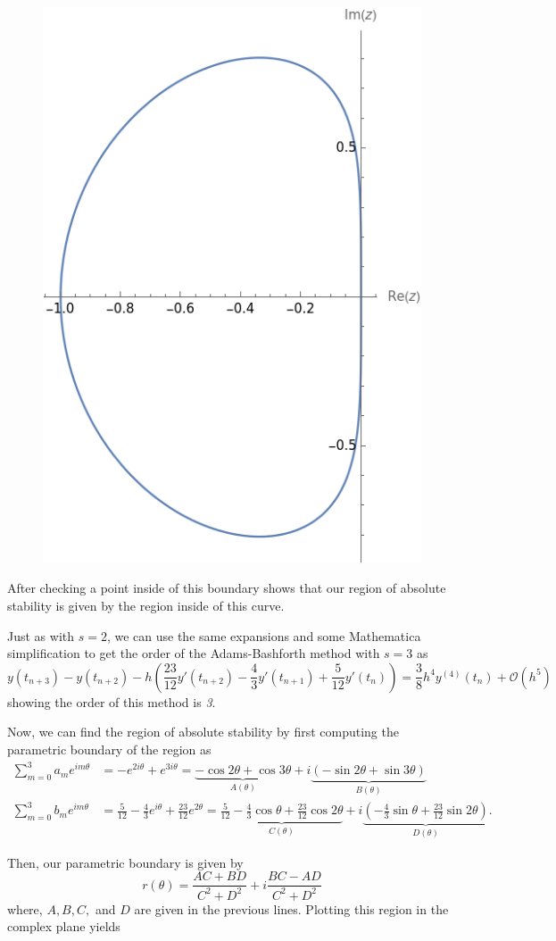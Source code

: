 \documentclass[a4paper,12pt]{article}
\newcommand{\bigO}{\mathcal{O}}
\begin{document}
\begin{enumerate}[label = (\arabic*)]
	\begin{figure}[h]
		\centering
		\includegraphics[width = 0.3 \textwidth]{Images/AB2.png}
	\end{figure}

	After checking a point inside of this boundary shows that our region of absolute stability is given by the region inside of this curve.
	
	\newpage
	Just as with $ s = 2 $, we can use the same expansions and some Mathematica simplification to get the order of the Adams-Bashforth method with $ s = 3 $ as
	\[
		y(t_{n + 3}) - y(t_{n + 2}) - h \left( \frac{23}{12} y'(t_{n + 2}) - \frac{4}{3} y'(t_{n + 1}) + \frac{5}{12} y'(t_n) \right) = \frac{3}{8} h^4 y^{(4)}(t_n) + \bigO(h^5)
	\]
	showing the order of this method is \emph{3}.
	
	Now, we can find the region of absolute stability by first computing the parametric boundary of the region as
	\begin{align*}
		\sum_{m = 0}^{3} a_m e^{i m \theta} &= -e^{2 i \theta} + e^{3 i \theta} = \underbrace{-\cos2\theta + \cos 3\theta}_{A(\theta)} + i \underbrace{(-\sin 2\theta + \sin 3\theta)}_{B(\theta)} \\
		\sum_{m = 0}^{3} b_m e^{i m \theta} &= \frac{5}{12} - \frac{4}{3} e^{i \theta} + \frac{23}{12} e^{2\theta} = \underbrace{\frac{5}{12} - \frac{4}{3} \cos \theta + \frac{23}{12} \cos 2\theta}_{C(\theta)} + i \underbrace{\left(-\frac{4}{3} \sin \theta + \frac{23}{12} \sin 2\theta\right)}_{D(\theta)}.
	\end{align*}

	Then, our parametric boundary is given by 
	\[
	r(\theta) = \frac{AC + BD}{C^2 + D^2} + i \frac{BC - AD}{C^2 + D^2}
	\]
	where, $ A, B, C, $ and $ D $ are given in the previous lines. Plotting this region in the complex plane yields
	

\end{enumerate}
\end{document}
